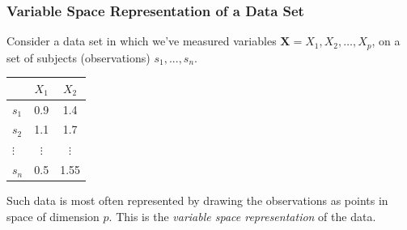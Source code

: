 \documentclass{beamer}
\begin{document}
\begin{frame}
  \frametitle{Variable Space Representation of a Data Set}

Consider a data set in which we've measured variables $\mathbf{X} = {X_1, X_2,\ldots,X_p}$, on a set of subjects (observations) $s_1,...,s_n$.

\begin{center}
    \begin{tabular}{l|cc}

 & $X_1$ & $X_2$ \\ \hline

$s_1$ & 0.9 & 1.4 \\
$s_2$ & 1.1 & 1.7 \\
$\vdots$ & $\vdots$ & $\vdots$ \\
$s_n$ & 0.5 &  1.55

    \end{tabular}
\end{center}

Such data is most often represented by drawing the observations as points in space of dimension $p$. This is the \emph{variable space representation} of the data.

\begin{center}
\end{center}


\end{frame}
\end{document}

